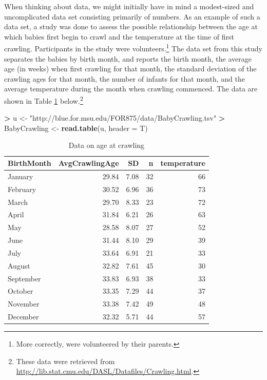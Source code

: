 \documentclass[]{krantz}
\makeatletter
\newenvironment{Shaded}{\begin{snugshade}}{\end{snugshade}}
\newcommand{\DataTypeTok}[1]{\textcolor[rgb]{0.27,0.27,0.27}{#1}}
\newcommand{\KeywordTok}[1]{\textcolor[rgb]{0.27,0.27,0.27}{\textbf{#1}}}
\newcommand{\NormalTok}[1]{#1}
\newcommand{\OperatorTok}[1]{\textcolor[rgb]{0.43,0.43,0.43}{\textbf{#1}}}
\newcommand{\StringTok}[1]{\textcolor[rgb]{0.5,0.5,0.5}{#1}}
\newenvironment{kframe}{%
\medskip{}
\setlength{\fboxsep}{.8em}
 \def\at@end@of@kframe{}%
 \ifinner\ifhmode%
  \def\at@end@of@kframe{\end{minipage}}%
  \begin{minipage}{\columnwidth}%
 \fi\fi%
 \def\FrameCommand##1{\hskip\@totalleftmargin \hskip-\fboxsep
 \colorbox{shadecolor}{##1}\hskip-\fboxsep
     \hskip-\linewidth \hskip-\@totalleftmargin \hskip\columnwidth}%
 \MakeFramed {\advance\hsize-\width
   \@totalleftmargin\z@ \linewidth\hsize
   \@setminipage}}%
 {\par\unskip\endMakeFramed%
 \at@end@of@kframe}
\renewenvironment{Shaded}{\begin{kframe}}{\end{kframe}}
\makeatother
\begin{document}
When thinking about data, we might initially have in mind a modest-sized and uncomplicated data set consisting primarily of numbers. As an example of such a data set, a study was done to assess the possible relationship between the age at which babies first begin to crawl and the temperature at the time of first crawling. Participants in the study were volunteers.\footnote{More correctly, were volunteered by their parents.} The data set from this study separates the babies by birth month, and reports the birth month, the average age (in weeks) when first crawling for that month, the standard deviation of the crawling ages for that month, the number of infants for that month, and the average temperature during the month when crawling commenced. The data are shown in Table \ref{tab:crawling} below.\footnote{These data were retrieved from \url{http://lib.stat.cmu.edu/DASL/Datafiles/Crawling.html}.}

\begin{Shaded}
\begin{Highlighting}[]
\OperatorTok{>}\StringTok{ }\NormalTok{u <-}\StringTok{ "http://blue.for.msu.edu/FOR875/data/BabyCrawling.tsv"}
\OperatorTok{>}\StringTok{ }\NormalTok{BabyCrawling <-}\StringTok{ }\KeywordTok{read.table}\NormalTok{(u, }\DataTypeTok{header =}\NormalTok{ T)}
\end{Highlighting}
\end{Shaded}

\begin{table}[t]

\caption{\label{tab:crawling}Data on age at crawling}
\centering
\begin{tabular}{lrrrr}
\toprule
BirthMonth & AvgCrawlingAge & SD & n & temperature\\
\midrule
January & 29.84 & 7.08 & 32 & 66\\
February & 30.52 & 6.96 & 36 & 73\\
March & 29.70 & 8.33 & 23 & 72\\
April & 31.84 & 6.21 & 26 & 63\\
May & 28.58 & 8.07 & 27 & 52\\
\addlinespace
June & 31.44 & 8.10 & 29 & 39\\
July & 33.64 & 6.91 & 21 & 33\\
August & 32.82 & 7.61 & 45 & 30\\
September & 33.83 & 6.93 & 38 & 33\\
October & 33.35 & 7.29 & 44 & 37\\
\addlinespace
November & 33.38 & 7.42 & 49 & 48\\
December & 32.32 & 5.71 & 44 & 57\\
\bottomrule
\end{tabular}
\end{table}
\end{document}
